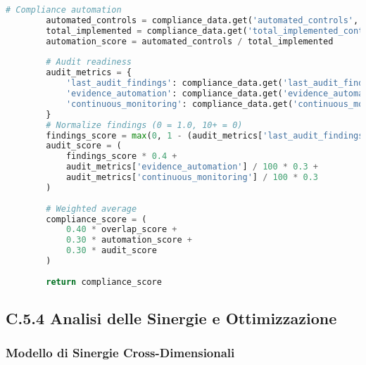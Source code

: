 \begin{lstlisting}[language=Python, caption=Calcolo Score Componenti GIST]
        # Compliance automation
        automated_controls = compliance_data.get('automated_controls', 0)
        total_implemented = compliance_data.get('total_implemented_controls', 1)
        automation_score = automated_controls / total_implemented
        
        # Audit readiness
        audit_metrics = {
            'last_audit_findings': compliance_data.get('last_audit_findings', 10),
            'evidence_automation': compliance_data.get('evidence_automation_rate', 0),
            'continuous_monitoring': compliance_data.get('continuous_monitoring_coverage', 0)
        }
        # Normalize findings (0 = 1.0, 10+ = 0)
        findings_score = max(0, 1 - (audit_metrics['last_audit_findings'] / 10))
        audit_score = (
            findings_score * 0.4 +
            audit_metrics['evidence_automation'] / 100 * 0.3 +
            audit_metrics['continuous_monitoring'] / 100 * 0.3
        )
        
        # Weighted average
        compliance_score = (
            0.40 * overlap_score +
            0.30 * automation_score +
            0.30 * audit_score
        )
        
        return compliance_score
\end{lstlisting}

\subsection{\texorpdfstring{\textbf{C.5.4 Analisi delle Sinergie e Ottimizzazione}}{C.5.4 - Analisi delle Sinergie e Ottimizzazione}}

\subsubsection{Modello di Sinergie Cross-Dimensionali}

